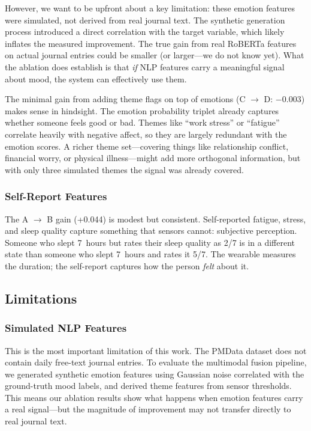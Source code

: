 \documentclass[conference]{IEEEtran}
\begin{document}
However, we want to be upfront about a key limitation: these emotion features were simulated, not derived from real journal text. The synthetic generation process introduced a direct correlation with the target variable, which likely inflates the measured improvement. The true gain from real RoBERTa features on actual journal entries could be smaller (or larger---we do not know yet). What the ablation does establish is that \textit{if} NLP features carry a meaningful signal about mood, the system can effectively use them.

The minimal gain from adding theme flags on top of emotions (C $\rightarrow$ D: $-$0.003) makes sense in hindsight. The emotion probability triplet already captures whether someone feels good or bad. Themes like ``work stress'' or ``fatigue'' correlate heavily with negative affect, so they are largely redundant with the emotion scores. A richer theme set---covering things like relationship conflict, financial worry, or physical illness---might add more orthogonal information, but with only three simulated themes the signal was already covered.

\subsubsection{Self-Report Features}

The A $\rightarrow$ B gain (+0.044) is modest but consistent. Self-reported fatigue, stress, and sleep quality capture something that sensors cannot: subjective perception. Someone who slept 7~hours but rates their sleep quality as 2/7 is in a different state than someone who slept 7~hours and rates it 5/7. The wearable measures the duration; the self-report captures how the person \textit{felt} about it.

\subsection{Limitations}

\subsubsection{Simulated NLP Features}

This is the most important limitation of this work. The PMData dataset does not contain daily free-text journal entries. To evaluate the multimodal fusion pipeline, we generated synthetic emotion features using Gaussian noise correlated with the ground-truth mood labels, and derived theme features from sensor thresholds. This means our ablation results show what happens when emotion features carry a real signal---but the magnitude of improvement may not transfer directly to real journal text.
\end{document}

